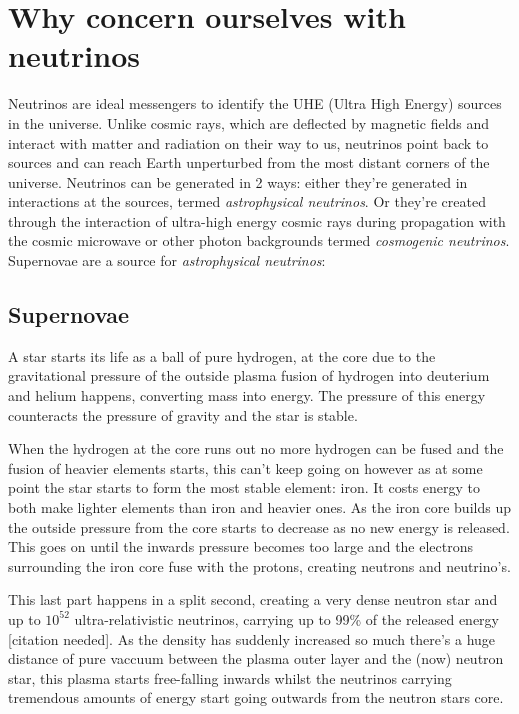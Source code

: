 \documentclass[11pt,a4paper,faculty=we,language=en,doctype=report]{cls/ugent-doc}
\begin{document}
\section{Why concern ourselves with neutrinos}
Neutrinos are ideal messengers to identify the UHE (Ultra High Energy) sources
in the universe. Unlike cosmic rays, which are deflected by magnetic fields and
interact with matter and radiation on their way to us, neutrinos point back to
sources and can reach Earth unperturbed from the most distant corners of the
universe.  Neutrinos can be generated in 2 ways: either they're generated in
interactions at the sources, termed \textit{astrophysical neutrinos}. Or
they're created through the interaction of ultra-high energy cosmic rays during
propagation with the cosmic microwave or other photon backgrounds termed
\textit{cosmogenic neutrinos}. 
Supernovae are a source for \textit{astrophysical neutrinos}:
\subsection{Supernovae}
A star starts its life as a ball of pure hydrogen, at the core due to the
gravitational pressure of the outside plasma fusion of hydrogen into deuterium
and helium happens, converting mass into energy. The pressure of this energy
counteracts the pressure of gravity and the star is stable.

When the hydrogen at the core runs out no more hydrogen can be fused and the
fusion of heavier elements starts, this can't keep going on however as at some
point the star starts to form the most stable element: iron.  It costs energy
to both make lighter elements than iron and heavier ones.  As the iron core
builds up the outside pressure from the core starts to decrease as no new
energy is released. This goes on until the inwards pressure becomes too large
and the electrons surrounding the iron core fuse with the protons, 
creating neutrons and neutrino's.

This last part happens in a split second, creating a very dense neutron star
and up to $10^{52}$ ultra-relativistic neutrinos, carrying up to 99\% of the
released energy [citation needed]. As the density has suddenly
increased so much there's a huge distance of pure vaccuum between the plasma
outer layer and the (now) neutron star, this plasma starts free-falling inwards 
whilst the neutrinos carrying tremendous amounts of energy start going outwards 
from the neutron stars core.
\end{document}
